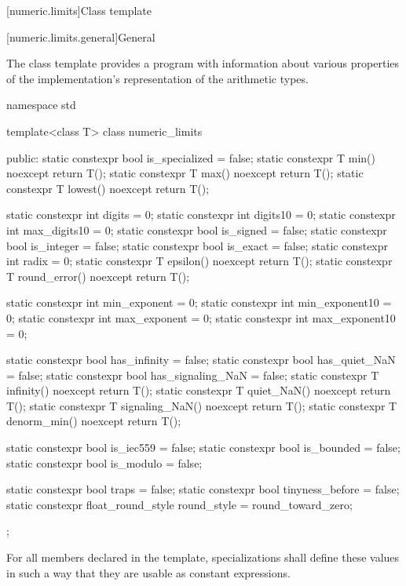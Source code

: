 [numeric.limits]{Class template }

[numeric.limits.general]{General}

\pnum
The
%
class template provides a \Cpp{} program with information about various properties of
the implementation's representation of the
arithmetic types.

%
\begin{codeblock}
namespace std {
  template<class T> class numeric_limits {
  public:
    static constexpr bool is_specialized = false;
    static constexpr T min() noexcept { return T(); }
    static constexpr T max() noexcept { return T(); }
    static constexpr T lowest() noexcept { return T(); }

    static constexpr int  digits = 0;
    static constexpr int  digits10 = 0;
    static constexpr int  max_digits10 = 0;
    static constexpr bool is_signed = false;
    static constexpr bool is_integer = false;
    static constexpr bool is_exact = false;
    static constexpr int  radix = 0;
    static constexpr T epsilon() noexcept { return T(); }
    static constexpr T round_error() noexcept { return T(); }

    static constexpr int  min_exponent = 0;
    static constexpr int  min_exponent10 = 0;
    static constexpr int  max_exponent = 0;
    static constexpr int  max_exponent10 = 0;

    static constexpr bool has_infinity = false;
    static constexpr bool has_quiet_NaN = false;
    static constexpr bool has_signaling_NaN = false;
    static constexpr T infinity() noexcept { return T(); }
    static constexpr T quiet_NaN() noexcept { return T(); }
    static constexpr T signaling_NaN() noexcept { return T(); }
    static constexpr T denorm_min() noexcept { return T(); }

    static constexpr bool is_iec559 = false;
    static constexpr bool is_bounded = false;
    static constexpr bool is_modulo = false;

    static constexpr bool traps = false;
    static constexpr bool tinyness_before = false;
    static constexpr float_round_style round_style = round_toward_zero;
  };
}
\end{codeblock}

\pnum
For all members declared
 
in the
template, specializations shall define these values in such a way
that they are usable as
constant expressions.

